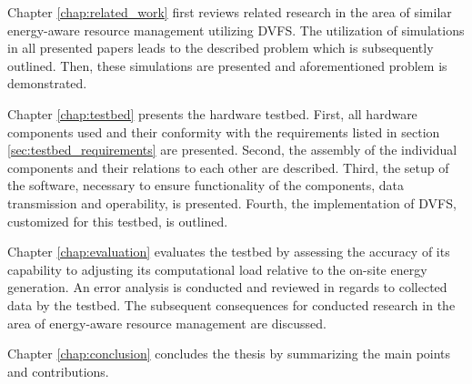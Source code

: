 Chapter \ref{chap:related_work} first reviews related research in the area of
similar energy-aware resource management utilizing DVFS. The utilization of simulations
in all presented papers leads to the described problem which is subsequently
outlined. Then, these simulations are presented and aforementioned problem is
demonstrated.

Chapter \ref{chap:testbed} presents the hardware testbed. First, all hardware
components used and their conformity with the requirements listed in section
\ref{sec:testbed_requirements} are presented. Second, the assembly of the
individual components and their relations to each other are described. Third,
the setup of the software, necessary to ensure functionality of the components,
data transmission and operability, is presented. Fourth, the implementation of
DVFS, customized for this testbed, is outlined.

Chapter \ref{chap:evaluation} evaluates the testbed by assessing the accuracy of
its capability to adjusting its computational load relative to the on-site
energy generation. An error analysis is conducted and reviewed in regards to
collected data by the testbed. The subsequent consequences for conducted
research in the area of energy-aware resource management are discussed.

Chapter \ref{chap:conclusion} concludes the thesis by summarizing the main
points and contributions.

